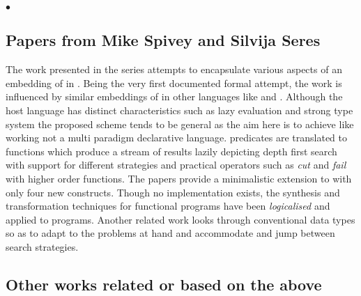 \documentclass[thesis-solanki.tex]{subfiles}
\begin{document}
$\bullet$
  \subsection{Papers from Mike Spivey and Silvija Seres}


  The work presented in the series
  \cite{spivey1999embedding,seres1999algebra,seres2001higher,spivey1999algebra,seres2001algebra} attempts to
  encapsulate various aspects of an embedding of  in .
  Being the very first documented formal attempt, the work is influenced by similar embeddings of 
  in other languages like  and .
  Although the host language has distinct characteristics such as lazy evaluation and strong type system the
  proposed scheme tends to be general as the aim here is to achieve  like working not a multi
  paradigm declarative language.
   predicates are translated to  functions which produce a stream of results
  lazily depicting depth first search with support for different strategies and practical operators such as
  \textit{cut} and \textit{fail} with higher order functions.
  The papers provide a minimalistic extension to  with only four new constructs.
  Though no implementation exists, the synthesis and transformation techniques for functional programs have been
  \textit{logicalised} and applied to  programs.
  Another related work \cite{spivey2000functional} looks through conventional data types so as to adapt to the
  problems at hand
  and accommodate and jump between search strategies.


  \subsection{Other works related or based on the above}

\end{document}
